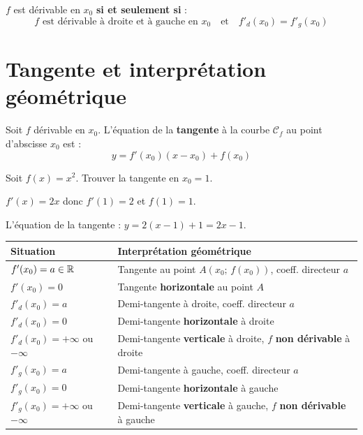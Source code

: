 \begin{propriete}
  $f$ est d\'{e}rivable en $x_0$ \textbf{si et seulement si} :
  \[
    f \text{ est d\'{e}rivable \`{a} droite et \`{a} gauche en } x_0
    \quad \text{et} \quad
    f'_d(x_0) = f'_g(x_0)
  \]
\end{propriete}

\section{Tangente et interpr\'{e}tation g\'{e}om\'{e}trique}

\begin{definition}
  Soit $f$ d\'{e}rivable en $x_0$. L'\'{e}quation de la \textbf{tangente}
  \`{a} la courbe $\mathcal{C}_f$ au point d'abscisse $x_0$ est :
  \[
    \boxed{y = f'(x_0)(x - x_0) + f(x_0)}
  \]
\end{definition}

\begin{exemple}[R\'{e}solu]
  Soit $f(x) = x^2$. Trouver la tangente en $x_0 = 1$.

  \medskip
  $f'(x) = 2x$ donc $f'(1) = 2$ et $f(1) = 1$.

  L'\'{e}quation de la tangente : $y = 2(x-1) + 1 = 2x - 1$.
\end{exemple}
\newpage
\begin{propriete}
  \bigskip
  \begin{center}
  \renewcommand{\arraystretch}{2}
  \begin{tabular}{|p{5cm}|p{8cm}|}
    \hline
    \textbf{\color{navy}Situation}
      & \textbf{\color{navy}Interpr\'{e}tation g\'{e}om\'{e}trique} \\
    \hline\hline
    $f'(x_0) = a \in \mathbb{R}$
      & Tangente au point $A(x_0;\,f(x_0))$, coeff. directeur $a$ \\
    \hline
    $f'(x_0) = 0$
      & Tangente \textbf{horizontale} au point $A$ \\
    \hline
    $f'_d(x_0) = a$
      & Demi-tangente \`{a} droite, coeff. directeur $a$ \\
    \hline
    $f'_d(x_0) = 0$
      & Demi-tangente \textbf{horizontale} \`{a} droite \\
    \hline
    $f'_d(x_0) = +\infty$ ou $-\infty$
      & Demi-tangente \textbf{verticale} \`{a} droite, $f$ \textbf{non d\'{e}rivable} \`{a} droite \\
    \hline
    $f'_g(x_0) = a$
      & Demi-tangente \`{a} gauche, coeff. directeur $a$ \\
    \hline
    $f'_g(x_0) = 0$
      & Demi-tangente \textbf{horizontale} \`{a} gauche \\
    \hline
    $f'_g(x_0) = +\infty$ ou $-\infty$
      & Demi-tangente \textbf{verticale} \`{a} gauche, $f$ \textbf{non d\'{e}rivable} \`{a} gauche \\
    \hline
  \end{tabular}
  \end{center}
\end{propriete}

